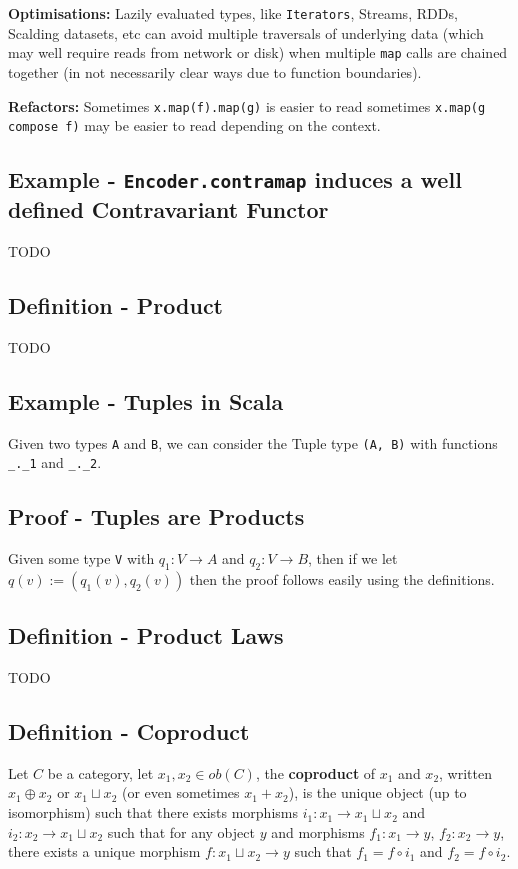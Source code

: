 \documentclass[9pt]{article} %
\begin{document}
\textbf{Optimisations:} Lazily evaluated types, like \texttt{Iterators}, Streams, RDDs, Scalding datasets, etc can avoid multiple traversals of underlying data (which may well require reads from network or disk) when multiple \texttt{map} calls are chained together (in not necessarily clear ways due to function boundaries).

\textbf{Refactors:} Sometimes \texttt{x.map(f).map(g)} is easier to read sometimes \texttt{x.map(g compose f)} may be easier to read depending on the context.

\subsection{Example - \texttt{Encoder.contramap} induces a well defined Contravariant Functor}

TODO

\subsection{Definition - Product}

TODO

\subsection{Example - Tuples in Scala}

Given two types \texttt{A} and \texttt{B}, we can consider the Tuple type \texttt{(A, B)} with functions \texttt{\_.\_1} and \texttt{\_.\_2}.

\subsection{Proof - Tuples are Products}

Given some type \texttt{V} with $q_1: V \rightarrow A$ and $q_2: V \rightarrow B$, then if we let $q(v) := (q_1(v), q_2(v))$ then the proof follows easily using the definitions.

\subsection{Definition - Product Laws}

TODO

\subsection{Definition - Coproduct}

Let $C$ be a category, let $x_1, x_2 \in ob(C)$, the \textbf{coproduct} of $x_1$ and $x_2$, written $x_1 \oplus x_2$ or $x_1 \sqcup x_2$ (or even sometimes $x_1 + x_2$), is the unique object (up to isomorphism) such that there exists morphisms $i_1: x_1 \rightarrow x_1 \sqcup x_2$ and $i_2: x_2 \rightarrow x_1 \sqcup x_2$ such that for any object $y$ and morphisms $f_1: x_1 \rightarrow y$, $f_2: x_2 \rightarrow y$, there exists a unique morphism $f: x_1 \sqcup x_2 \rightarrow y$ such that $f_1 = f \circ i_1$ and $f_2 = f \circ i_2$.
\end{document}
